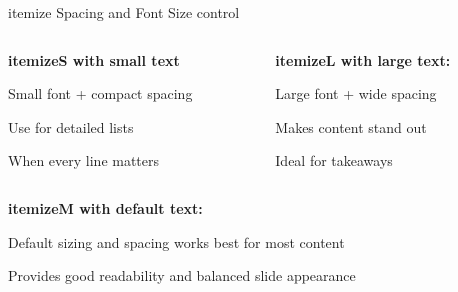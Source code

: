 \documentclass[11pt,compress,t,notes=noshow, xcolor=table]{beamer}
\begin{document}
\begin{frame}{itemize Spacing and Font Size control}
  
  \begin{columns}[T]
    \begin{column}{0.48\textwidth}
      \textbf{itemizeS with small text}
      \begin{itemizeS}[small]
        \item Small font + compact spacing
        \item Use for detailed lists
        \item When every line matters
      \end{itemizeS}
    \end{column}
    
    \begin{column}{0.48\textwidth}
      \textbf{itemizeL with large text:}
      \begin{itemizeL}[large]
        \item Large font + wide spacing
        \item Makes content stand out
        \item Ideal for takeaways
      \end{itemizeL}
    \end{column}
  \end{columns}
  
  \vspace{2ex}
  
  \textbf{itemizeM with default text:}
  \begin{itemizeM}
    \item Default sizing and spacing works best for most content
    \item Provides good readability and balanced slide appearance
  \end{itemizeM}
  
\end{frame}


  
  
\end{document}
